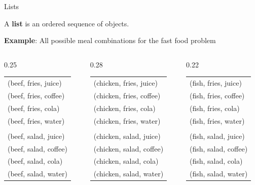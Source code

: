 \documentclass[dvipsnames, 10pt]{beamer}
\begin{document}
\begin{frame}{Lists}

\begin{mygreenbox}[title=Definition]
A \textbf{list} is an ordered sequence of objects.
\end{mygreenbox}

\pause \vfill 

\colorbox{yellow!30}{\textbf{Example}: All possible meal combinations for the fast food problem}
\small
\begin{columns}[t]
  \begin{column}{0.25\textwidth}
    \begin{tabular}{l}
      (beef, fries, juice) \\
      (beef, fries, coffee) \\
      (beef, fries, cola) \\
      (beef, fries, water) \\
      \\
      (beef, salad, juice) \\
      (beef, salad, coffee) \\
      (beef, salad, cola) \\
      (beef, salad, water) \\
    \end{tabular}
  \end{column}

  \begin{column}{0.28\textwidth}
    \begin{tabular}{l}
      (chicken, fries, juice) \\
      (chicken, fries, coffee) \\
      (chicken, fries, cola) \\
      (chicken, fries, water) \\
      \\
      (chicken, salad, juice) \\
      (chicken, salad, coffee) \\
      (chicken, salad, cola) \\
      (chicken, salad, water) \\
    \end{tabular}
  \end{column}

  \begin{column}{0.22\textwidth}
    \begin{tabular}{l}
      (fish, fries, juice) \\
      (fish, fries, coffee) \\
      (fish, fries, cola) \\
      (fish, fries, water) \\
      \\
      (fish, salad, juice) \\
      (fish, salad, coffee) \\
      (fish, salad, cola) \\
      (fish, salad, water) \\
    \end{tabular}
  \end{column}


\end{columns}
\end{frame}
\end{document}
